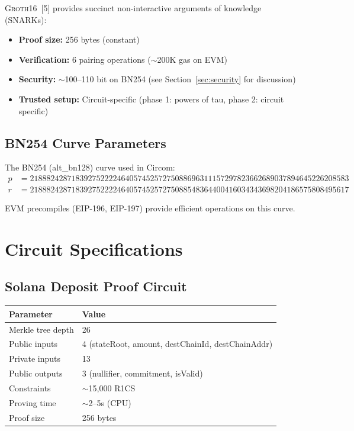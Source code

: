 \documentclass[11pt,a4paper,twoside]{article}
\newcommand{\groth}{\textsc{Groth16}}
\begin{document}
\groth{}~[5] provides succinct non-interactive arguments of knowledge (SNARKs):
\begin{itemize}
    \item \textbf{Proof size:} 256 bytes (constant)
    \item \textbf{Verification:} 6 pairing operations ($\sim$200K gas on EVM)
    \item \textbf{Security:} $\sim$100--110 bit on BN254 (see Section~\ref{sec:security} for discussion)
    \item \textbf{Trusted setup:} Circuit-specific (phase 1: powers of tau, phase 2: circuit specific)
\end{itemize}

\subsection{BN254 Curve Parameters}

The BN254 (alt\_bn128) curve used in Circom:
\begin{align*}
p &= 21888242871839275222246405745257275088696311157297823662689037894645226208583 \\
r &= 21888242871839275222246405745257275088548364400416034343698204186575808495617
\end{align*}

EVM precompiles (EIP-196, EIP-197) provide efficient operations on this curve.

\section{Circuit Specifications}
\label{app:circuits}

\subsection{Solana Deposit Proof Circuit}

\begin{table}[H]
\centering
\begin{tabular}{@{}ll@{}}
\toprule
\textbf{Parameter} & \textbf{Value} \\
\midrule
Merkle tree depth & 26 \\
Public inputs & 4 (stateRoot, amount, destChainId, destChainAddr) \\
Private inputs & 13 \\
Public outputs & 3 (nullifier, commitment, isValid) \\
Constraints & $\sim$15,000 R1CS \\
Proving time & $\sim$2--5s (CPU) \\
Proof size & 256 bytes \\
\bottomrule
\end{tabular}
\end{table}
\end{document}

